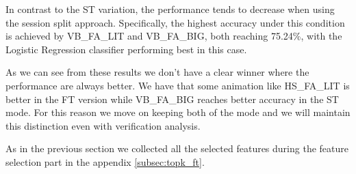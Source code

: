 \documentclass{article}
\begin{document}
In contrast to the ST variation, the performance tends to decrease when using the session split approach.
Specifically, the highest accuracy under this condition is achieved by VB\_FA\_LIT and VB\_FA\_BIG, both reaching 75.24\%, with the Logistic Regression classifier performing best in this case.

As we can see from these results we don't have a clear winner where the performance are always better.
We have that some animation like HS\_FA\_LIT is better in the FT version while VB\_FA\_BIG reaches better accuracy in the ST mode.
For this reason we move on keeping both of the mode and we will maintain this distinction even with verification analysis.

As in the previous section we collected all the selected features during the feature selection part in the appendix \ref{subsec:topk_ft}.
\end{document}

